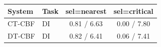 \begin{tabular}{llcc}
\hline
System & Task & sel=nearest & sel=critical \\
\hline
CT-CBF & DI & 0.81 / 6.63 & 0.00 / 7.80 \\
DT-CBF & DI & 0.82 / 6.41 & 0.06 / 7.41 \\
\hline
\end{tabular}
